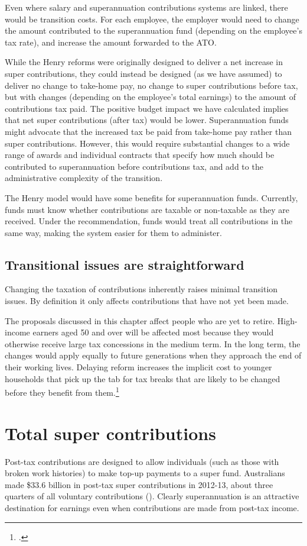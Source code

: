 Even where salary and superannuation contributions systems are linked, there would be transition costs. For each employee, the employer would need to change the amount contributed to the superannuation fund (depending on the employee’s tax rate), and increase the amount forwarded to the ATO. 

While the Henry reforms were originally designed to deliver a net increase in super contributions, they could instead be designed (as we have assumed) to deliver no change to take-home pay, no change to super contributions before tax, but with changes (depending on the employee’s total earnings) to the amount of contributions tax paid. The positive budget impact we have calculated implies that net super contributions (after tax) would be lower. Superannuation funds might advocate that the increased tax be paid from take-home pay rather than super contributions. However, this would require substantial changes to a wide range of awards and individual contracts that specify how much should be contributed to superannuation before contributions tax, and add to the administrative complexity of the transition.

The Henry model would have some benefits for superannuation funds. Currently, funds must know whether contributions are taxable or non-taxable as they are received. Under the recommendation, funds would treat all contributions in the same way, making the system easier for them to administer.

\section{Transitional issues are straightforward}
Changing the taxation of contributions inherently raises minimal transition issues. By definition it only affects contributions that have not yet been made.

The proposals discussed in this chapter affect people who are yet to retire. High-income earners aged 50 and over will be affected most because they would otherwise receive large tax concessions in the medium term. In the long term, the changes would apply equally to future generations when they approach the end of their working lives. Delaying reform increases the implicit cost to younger households that pick up the tab for tax breaks that are likely to be changed before they benefit from them.\footcite{DaleyWoodWeidmannEtAl2014}

\chapter{Total super contributions} 
Post-tax contributions are designed to allow individuals (such as those with broken work histories) to make top-up payments to a super fund. Australians made \$33.6 billion in post-tax super contributions in 2012-13, about three quarters of all voluntary contributions (). Clearly superannuation is an attractive destination for earnings even when contributions are made from post-tax income. 

